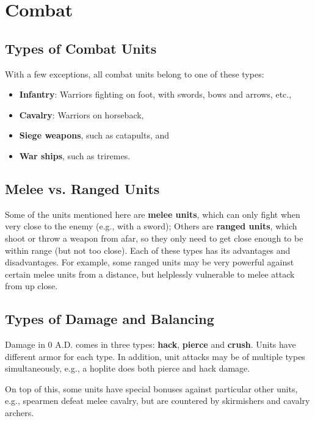 \documentclass[a4paper,titlepage]{article}
\begin{document}
\clearpage

\section{Combat}

\subsection*{Types of Combat Units}

With a few exceptions, all combat units belong to one of these types:

\begin{itemize}
\item \textbf{Infantry}: Warriors fighting on foot, with swords, bows and arrows, etc.,
\item \textbf{Cavalry}: Warriors on horseback,
\item \textbf{Siege weapons}, such as catapults, and
\item \textbf{War ships}, such as triremes.
\end{itemize}

\subsection*{Melee vs. Ranged Units}

Some of the units mentioned here are \textbf{melee units}, which can only fight when very close to the enemy (e.g., with a sword); Others are \textbf{ranged units}, which shoot or throw a weapon from afar, so they only need to get close enough to be within range (but not too close). Each of these types has its advantages and disadvantages. For example, some ranged units may be very powerful against certain melee units from a distance, but helplessly vulnerable to melee attack from up close.

\subsection*{Types of Damage and Balancing}

Damage in 0 A.D. comes in three types: \textbf{hack}, \textbf{pierce} and \textbf{crush}. Units have different armor for each type. In addition, unit attacks may be of multiple types simultaneously, e.g., a hoplite does both pierce and hack damage.

On top of this, some units have special bonuses against particular other units, e.g., spearmen defeat melee cavalry, but are countered by skirmishers and cavalry archers.
\end{document}
